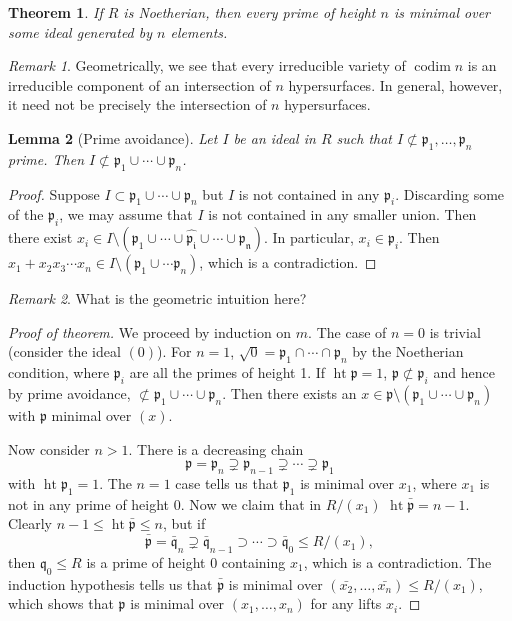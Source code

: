 \documentclass{article}
\newcommand{\fr}{\mathfrak}
\DeclareMathOperator{\codim}{codim}
\DeclareMathOperator{\hgt}{ht}
\theoremstyle{plain}
\newtheorem{thm}{Theorem}
\newtheorem{lem}[thm]{Lemma}
\theoremstyle{definition}
\theoremstyle{remark}
\newtheorem*{rem}{Remark}
\begin{document}
\begin{thm}
    If $R$ is Noetherian, then every prime of height $n$ is minimal over some ideal generated
    by $n$ elements.
\end{thm}

\begin{rem}
    Geometrically, we see that every irreducible variety of $\codim n$ is an irreducible component
    of an intersection of $n$ hypersurfaces. In general, however, it need not be precisely
    the intersection of $n$ hypersurfaces.
\end{rem}

\begin{lem}[Prime avoidance]
    Let $I$ be an ideal in $R$ such that $I\not\subset\fr p_1,\ldots,\fr p_n$ prime. Then
    $I\not\subset\fr p_1\cup\cdots\cup\fr p_n$.
\end{lem}
\begin{proof}
    Suppose $I\subset \fr p_1\cup\cdots\cup\fr p_n$ but $I$ is not contained in any $\fr p_i$.
    Discarding some of the $\fr p_i$, we may assume that $I$ is not contained in any smaller union.
    Then there exist $x_i\in I\setminus (\fr{p_1}\cup\cdots\cup\hat{\fr{p_i}}\cup\cdots\cup\fr{p_n})$.
    In particular, $x_i\in\fr p_i$. Then $x_1+x_2x_3\cdots x_n\in I\setminus(\fr p_1\cup\cdots\fr p_n)$,
    which is a contradiction.
\end{proof}

\begin{rem}
    What is the geometric intuition here?
\end{rem}

\begin{proof}[Proof of theorem]
    We proceed by induction on $m$. The case of $n=0$ is trivial (consider the ideal $(0)$).
    For $n=1$, $\sqrt{0}=\fr p_1\cap\cdots\cap\fr p_n$ by the Noetherian condition, where $\fr p_i$
    are all the primes of height 1.
    If $\hgt\fr p=1$,
    $\fr p\not\subset\fr p_i$ and hence by prime avoidance, $\not\subset \fr p_1\cup\cdots\cup\fr p_n$.
    Then there exists an $x\in\fr p\setminus(\fr p_1\cup\cdots\cup\fr p_n)$ with $\fr p$ minimal
    over $(x)$.

    Now consider $n>1$. There is a decreasing chain
    \[\fr p=\fr p_n\supsetneq\fr p_{n-1}\supsetneq\cdots\supsetneq \fr p_1\]
    with $\hgt\fr p_1=1$. The $n=1$ case tells us that $\fr p_1$ is minimal over
    $x_1$, where $x_1$ is not in any prime of height 0. Now we claim that in $R/(x_1)$
    $\hgt\bar{\fr p}=n-1$. Clearly $n-1\leq\hgt\bar{\fr p}\leq n$, but if 
    \[\bar{\fr p}=\bar{\fr q}_n\supsetneq\bar{\fr q}_{n-1}\supset\cdots\supset\bar{\fr q}_0\leq R/(x_1),\]
    then $\fr q_0\leq R$ is a prime of height 0 containing $x_1$, which is a contradiction.
    The induction hypothesis tells us that $\bar{\fr p}$ is minimal over $(\bar{x_2},\ldots,\bar{x_n})\leq R/(x_1)$,
    which shows that $\fr p$ is minimal over $(x_1,\ldots, x_n)$ for any lifts $x_i$.
\end{proof}
\end{document}

